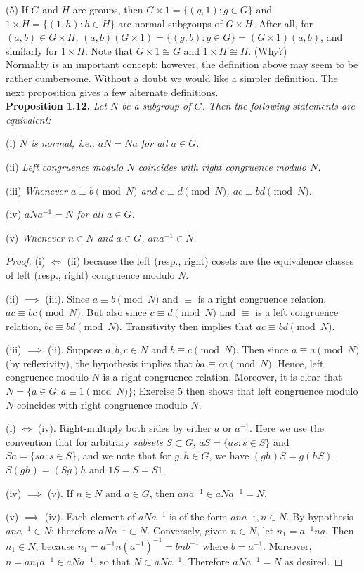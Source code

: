 \documentclass[leqno]{book}
\begin{document}
(5) If $G$ and $H$ are groups, then $G\times 1=\{(g,1):g\in G\}$ and $1\times H=\{(1,h):h\in H\}$ are normal subgroups of $G\times H$.  After all, for $(a,b)\in G\times H$, $(a,b)(G\times 1)=\{(g,b):g\in G\}=(G\times 1)(a,b)$, and similarly for $1\times H$.  Note that $G\times 1\cong G$ and $1\times H\cong H$.  (Why?)\\

\noindent Normality is an important concept; however, the definition above may seem to be rather cumbersome.  Without a doubt we would like a simpler definition.  The next proposition gives a few alternate definitions.\\

\noindent\textbf{Proposition 1.12.} \emph{Let $N$ be a subgroup of $G$.  Then the following statements are equivalent:}

(i) \emph{$N$ is normal, i.e., $aN=Na$ for all $a\in G$.}

(ii) \emph{Left congruence modulo $N$ coincides with right congruence modulo $N$.}

(iii) \emph{Whenever $a\equiv b\pmod N$ and $c\equiv d\pmod N$, $ac\equiv bd\pmod N$.} %

(iv) \emph{$aNa^{-1}=N$ for all $a\in G$.}

(v) \emph{Whenever $n\in N$ and $a\in G$, $ana^{-1}\in N$.}
\begin{proof}
(i) $\iff$ (ii) because the left (resp., right) cosets are the equivalence classes of left (resp., right) congruence modulo $N$.

(ii) $\implies$ (iii). Since $a\equiv b\pmod N$ and $\equiv$ is a right congruence relation, $ac\equiv bc\pmod N$.  But also since $c\equiv d\pmod N$ and $\equiv$ is a left congruence relation, $bc\equiv bd\pmod N$.  Transitivity then implies that $ac\equiv bd\pmod N$.

(iii) $\implies$ (ii). Suppose $a,b,c\in N$ and $b\equiv c\pmod N$.  Then since $a\equiv a\pmod N$ (by reflexivity), the hypothesis implies that $ba\equiv ca\pmod N$.  Hence, left congruence modulo $N$ is a right congruence relation.  Moreover, it is clear that $N=\{a\in G:a\equiv 1\pmod N\}$; Exercise 5 then shows that left congruence modulo $N$ coincides with right congruence modulo $N$.

(i) $\iff$ (iv). Right-multiply both sides by either $a$ or $a^{-1}$.  Here we use the convention that for arbitrary \emph{subsets} $S\subset G$, $aS=\{as:s\in S\}$ and $Sa=\{sa:s\in S\}$, and we note that for $g,h\in G$, we have $(gh)S=g(hS)$, $S(gh)=(Sg)h$ and $1S=S=S1$.

(iv) $\implies$ (v). If $n\in N$ and $a\in G$, then $ana^{-1}\in aNa^{-1}=N$.

(v) $\implies$ (iv). Each element of $aNa^{-1}$ is of the form $ana^{-1},n\in N$.  By hypothesis $ana^{-1}\in N$; therefore $aNa^{-1}\subset N$.  Conversely, given $n\in N$, let $n_1=a^{-1}na$.  Then $n_1\in N$, because $n_1=a^{-1}n(a^{-1})^{-1}=bnb^{-1}$ where $b=a^{-1}$.  Moreover, $n=an_1a^{-1}\in aNa^{-1}$, so that $N\subset aNa^{-1}$.  Therefore $aNa^{-1}=N$ as desired.
\end{proof}
\end{document}
